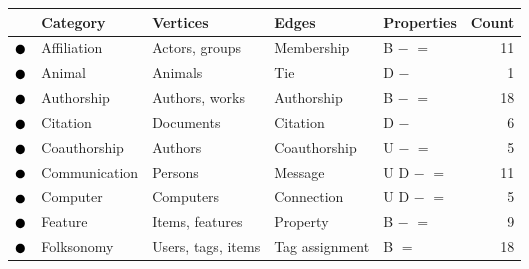 \begin{tabular}{lllllr}
\toprule
& \textbf{Category} & \textbf{Vertices} & \textbf{Edges} & \textbf{Properties} & \textbf{Count} \\
\midrule
\textcolor{colorAffiliation}{$\newmoon$} &Affiliation & Actors, groups & Membership & \phantom{U} \phantom{D} B $-$ $=$ \phantom{$+$} \phantom{$\pm$} \phantom{$\stackrel{+}{=}$} \phantom{$*$} \phantom{$_*{}^*$} \phantom{$\rightleftarrows$} \phantom{$++$}  &  11 \\
\textcolor{colorAnimal}{$\newmoon$} &Animal & Animals & Tie & \phantom{U} D \phantom{B} $-$ \phantom{$=$} \phantom{$+$} \phantom{$\pm$} \phantom{$\stackrel{+}{=}$} \phantom{$*$} \phantom{$_*{}^*$} \phantom{$\rightleftarrows$} \phantom{$++$}  &  1 \\
\textcolor{colorAuthorship}{$\newmoon$} &Authorship & Authors, works & Authorship & \phantom{U} \phantom{D} B $-$ $=$ \phantom{$+$} \phantom{$\pm$} \phantom{$\stackrel{+}{=}$} \phantom{$*$} \phantom{$_*{}^*$} \phantom{$\rightleftarrows$} \phantom{$++$}  &  18 \\
\textcolor{colorCitation}{$\newmoon$} &Citation & Documents & Citation & \phantom{U} D \phantom{B} $-$ \phantom{$=$} \phantom{$+$} \phantom{$\pm$} \phantom{$\stackrel{+}{=}$} \phantom{$*$} \phantom{$_*{}^*$} \phantom{$\rightleftarrows$} \phantom{$++$}  &  6 \\
\textcolor{colorCoauthorship}{$\newmoon$} &Coauthorship & Authors & Coauthorship & U \phantom{D} \phantom{B} $-$ $=$ \phantom{$+$} \phantom{$\pm$} \phantom{$\stackrel{+}{=}$} \phantom{$*$} \phantom{$_*{}^*$} \phantom{$\rightleftarrows$} \phantom{$++$}  &  5 \\
\textcolor{colorCommunication}{$\newmoon$} &Communication & Persons & Message & U D \phantom{B} $-$ $=$ \phantom{$+$} \phantom{$\pm$} \phantom{$\stackrel{+}{=}$} \phantom{$*$} \phantom{$_*{}^*$} \phantom{$\rightleftarrows$} \phantom{$++$}  &  11 \\
\textcolor{colorComputer}{$\newmoon$} &Computer & Computers & Connection & U D \phantom{B} $-$ $=$ \phantom{$+$} \phantom{$\pm$} \phantom{$\stackrel{+}{=}$} \phantom{$*$} \phantom{$_*{}^*$} \phantom{$\rightleftarrows$} \phantom{$++$}  &  5 \\
\textcolor{colorFeature}{$\newmoon$} &Feature & Items, features & Property & \phantom{U} \phantom{D} B $-$ $=$ \phantom{$+$} \phantom{$\pm$} \phantom{$\stackrel{+}{=}$} \phantom{$*$} \phantom{$_*{}^*$} \phantom{$\rightleftarrows$} \phantom{$++$}  &  9 \\
\textcolor{colorFolksonomy}{$\newmoon$} &Folksonomy & Users, tags, items & Tag assignment & \phantom{U} \phantom{D} B \phantom{$-$} $=$ \phantom{$+$} \phantom{$\pm$} \phantom{$\stackrel{+}{=}$} \phantom{$*$} \phantom{$_*{}^*$} \phantom{$\rightleftarrows$} \phantom{$++$}  &  18 \\

\end{tabular}

